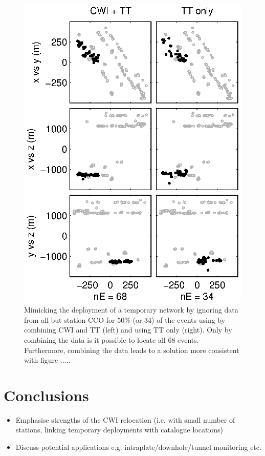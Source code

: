 \documentclass[extra]{gji}
\begin{document}
\begin{figure}
\includegraphics{diags/CalaverasLoc6_hypoDD_SVD.eps}
\caption{Mimicking the deployment of a temporary network by ignoring
data from all but station CCO for 50\% (or 34) of the events using
by combining CWI and TT (left) and using TT only (right). Only by
combining the data is it possible to locate all 68 events.
Furthermore, combining the data leads to a solution more consistent
with figure ..... } \label{fig-68Calaverasevents_ttsubsetandcoda1}
\end{figure}









\section{Conclusions}
\begin{itemize}
\item Emphasise strengths of the CWI relocation (i.e. with small number of stations,
linking temporary deployments with catalogue locations)
\item Discuss potential applications e.g. intraplate/downhole/tunnel monitoring etc.
\end{itemize}
\end{document}
